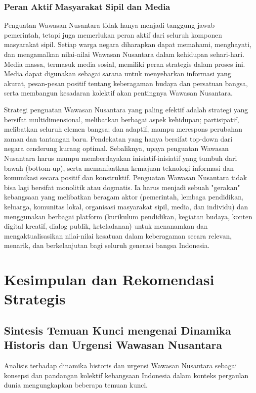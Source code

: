 \documentclass[12pt, a4paper]{article}
\begin{document}
\subsubsection*{Peran Aktif Masyarakat Sipil dan Media}

Penguatan Wawasan Nusantara tidak hanya menjadi tanggung jawab pemerintah, tetapi juga memerlukan peran aktif dari seluruh komponen masyarakat sipil. Setiap warga negara diharapkan dapat memahami, menghayati, dan mengamalkan nilai-nilai Wawasan Nusantara dalam kehidupan sehari-hari. Media massa, termasuk media sosial, memiliki peran strategis dalam proses ini. Media dapat digunakan sebagai sarana untuk menyebarkan informasi yang akurat, pesan-pesan positif tentang keberagaman budaya dan persatuan bangsa, serta membangun kesadaran kolektif akan pentingnya Wawasan Nusantara.  

Strategi penguatan Wawasan Nusantara yang paling efektif adalah strategi yang bersifat multidimensional, melibatkan berbagai aspek kehidupan; partisipatif, melibatkan seluruh elemen bangsa; dan adaptif, mampu merespons perubahan zaman dan tantangan baru. Pendekatan yang hanya bersifat top-down dari negara cenderung kurang optimal. Sebaliknya, upaya penguatan Wawasan Nusantara harus mampu memberdayakan inisiatif-inisiatif yang tumbuh dari bawah (bottom-up), serta memanfaatkan kemajuan teknologi informasi dan komunikasi secara positif dan konstruktif. Penguatan Wawasan Nusantara tidak bisa lagi bersifat monolitik atau dogmatis. Ia harus menjadi sebuah "gerakan" kebangsaan yang melibatkan beragam aktor (pemerintah, lembaga pendidikan, keluarga, komunitas lokal, organisasi masyarakat sipil, media, dan individu) dan menggunakan berbagai platform (kurikulum pendidikan, kegiatan budaya, konten digital kreatif, dialog publik, keteladanan) untuk menanamkan dan mengaktualisasikan nilai-nilai kesatuan dalam keberagaman secara relevan, menarik, dan berkelanjutan bagi seluruh generasi bangsa Indonesia.
\section{Kesimpulan dan Rekomendasi Strategis}
\subsection*{Sintesis Temuan Kunci mengenai Dinamika Historis dan Urgensi Wawasan Nusantara}

Analisis terhadap dinamika historis dan urgensi Wawasan Nusantara sebagai konsepsi dan pandangan kolektif kebangsaan Indonesia dalam konteks pergaulan dunia mengungkapkan beberapa temuan kunci. 
\end{document}
